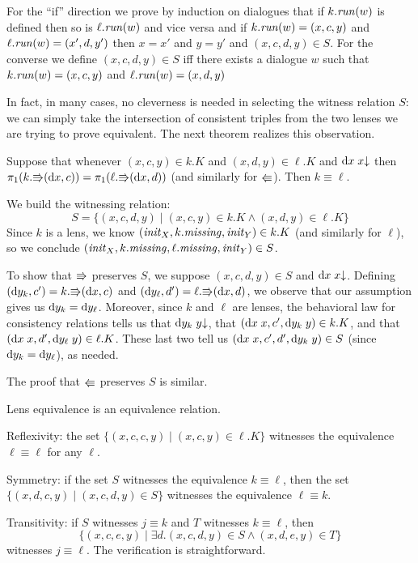 \iffull
\begin{pf}
  For the ``if'' direction we prove by induction on dialogues that if
  $k.\mathit{run}(w)$ is defined then so is $\ell.\mathit{run}(w)$ and vice versa and
  if $k.\mathit{run}(w)=(x,c,y)$ and $\ell.\mathit{run}(w)=(x',d,y')$ then $x=x'$ and
  $y=y'$ and $(x,c,d,y)\in S$. For the converse we define
  $(x,c,d,y)\in S$ iff there exists a dialogue $w$ such that
  $k.\mathit{run}(w)=(x,c,y)$ and $\ell.\mathit{run}(w)=(x,d,y)$ 
\end{pf}
In fact, in many cases, no cleverness is needed in selecting the witness
relation $S$: we can simply take the intersection of consistent triples from
the two lenses we are trying to prove equivalent. The next theorem realizes
this observation.

\begin{theorem}
    \label{thm:mechanical-bisim}
    Suppose that whenever $(x,c,y) \in k.K$ and $(x,d,y) \in \ell.K$ and
    $\textrm{d} x\;x{\downarrow}$ then $\pi_1(k.\mathord{\Rrightarrow}(\textrm{d} x,c))=\pi_1(\ell.\mathord{\Rrightarrow}(\textrm{d} x,d))$
    (and similarly for $\mathord{\Lleftarrow}$). Then $k \equiv \ell$.
\end{theorem}
\begin{pf}
    We build the witnessing relation:
    \[S = \{(x,c,d,y) \mid (x,c,y) \in k.K \land (x,d,y) \in \ell.K\}\]
    Since $k$ is a lens, we know $(\mathit{init}_X,k.\mathit{missing},\mathit{init}_Y) \in k.K$ (and
    similarly for $\ell$), so we conclude
    $(\mathit{init}_X,k.\mathit{missing},\ell.\mathit{missing},\mathit{init}_Y) \in S$.

    To show that $\mathord{\Rrightarrow}$ preserves $S$, we suppose $(x,c,d,y) \in S$ and
    $\textrm{d} x\;x{\downarrow}$. Defining $(\textrm{d} y_k,c') = k.\mathord{\Rrightarrow}(\textrm{d} x,c)$ and
    $(\textrm{d} y_\ell,d') = \ell.\mathord{\Rrightarrow}(\textrm{d} x,d)$, we observe that our assumption
    gives us $\textrm{d} y_k=\textrm{d} y_\ell$. Moreover, since $k$ and $\ell$ are lenses,
    the behavioral law for consistency relations tells us that
    $\textrm{d} y_k\;y{\downarrow}$, that $(\textrm{d} x\;x,c',\textrm{d} y_k\;y) \in k.K$, and that
    $(\textrm{d} x\;x,d',\textrm{d} y_\ell\;y) \in \ell.K$. These last two tell us
    $(\textrm{d} x\;x,c',d',\textrm{d} y_k\;y) \in S$ (since $\textrm{d} y_k=\textrm{d} y_\ell$), as needed.

    The proof that $\mathord{\Lleftarrow}$ preserves $S$ is similar.
\end{pf}

\begin{theorem}
    Lens equivalence is an equivalence relation.
\end{theorem}
\begin{pf}
    Reflexivity: the set $\{(x,c,c,y) \mid (x,c,y) \in \ell.K\}$ witnesses the
    equivalence $\ell\equiv\ell$ for any $\ell$.

    Symmetry: if the set $S$ witnesses the equivalence $k\equiv\ell$, then
    the set $\{(x,d,c,y) \mid (x,c,d,y) \in S\}$ witnesses the equivalence
    $\ell \equiv k$.

    Transitivity: if $S$ witnesses $j \equiv k$ and $T$ witnesses
    $k\equiv\ell$, then
    \[\{(x,c,e,y) \mid \exists d. (x,c,d,y) \in S \land (x,d,e,y) \in T\}\]
    witnesses $j\equiv\ell$. The verification is straightforward.
\end{pf}
\fi

